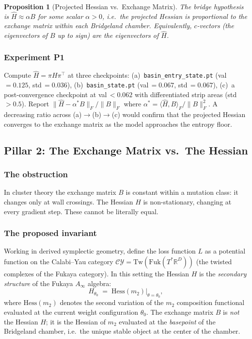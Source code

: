 \documentclass[11pt]{amsart}
\newtheorem{proposition}[theorem]{Proposition}
\begin{document}
\begin{proposition}[Projected Hessian vs.\ Exchange Matrix]
\label{prop:proj_hess}
The bridge hypothesis is $\hat{H} \approx \alpha B$ for some
scalar $\alpha > 0$, i.e.\ the projected Hessian is proportional
to the exchange matrix within each Bridgeland chamber.
Equivalently, $c$-vectors (the eigenvectors of $B$ up to sign) are
the eigenvectors of $\hat{H}$.
\end{proposition}

\subsubsection*{Experiment P1}

Compute $\hat{H} = \pi H \pi^\top$ at three checkpoints:
(a)~\texttt{basin\_entry\_state.pt} (val\,$=0.125$, std\,$=0.036$),
(b)~\texttt{basin\_state.pt} (val\,$=0.067$, std\,$=0.067$),
(c)~a post-convergence checkpoint at val\,$<0.062$ with
differentiated strip areas (std\,$>0.5$).
Report $\|\hat{H} - \alpha^* B\|_F / \|B\|_F$ where
$\alpha^* = \langle \hat{H}, B\rangle_F / \|B\|_F^2$.
A decreasing ratio across (a)$\to$(b)$\to$(c) would confirm
that the projected Hessian converges to the exchange matrix
as the model approaches the entropy floor.

\subsection{Pillar 2: The Exchange Matrix vs.\ The Hessian}
\label{sec:pillar2}

\subsubsection*{The obstruction}

In cluster theory the exchange matrix $B$ is constant within a
mutation class: it changes only at wall crossings.
The Hessian $H$ is non-stationary, changing at every gradient step.
These cannot be literally equal.

\subsubsection*{The proposed invariant}

Working in derived symplectic geometry, define the loss function $L$
as a potential function on the Calabi--Yau category
$\mathcal{CY} = \mathrm{Tw}(\mathrm{Fuk}(T^*\mathbb{R}^D))$
(the twisted complexes of the Fukaya category).
In this setting the Hessian $H$ is the \emph{secondary structure}
of the Fukaya $A_\infty$ algebra:
\[
  H_{\theta_0} \;=\; \mathrm{Hess}(m_2)\big|_{\theta = \theta_0},
\]
where $\mathrm{Hess}(m_2)$ denotes the second variation of the
$m_2$ composition functional evaluated at the current weight
configuration $\theta_0$.
The exchange matrix $B$ is \emph{not} the Hessian $H$; it is the
Hessian of $m_2$ evaluated at the \emph{basepoint} of the
Bridgeland chamber, i.e.\ the unique stable object at the center of
the chamber.
\end{document}
